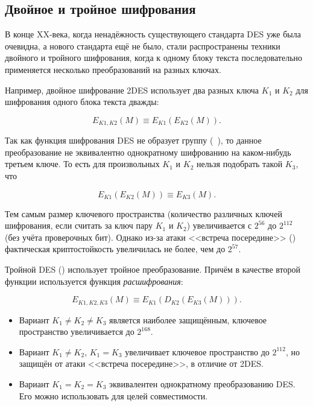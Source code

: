 \subsection{Двойное и тройное шифрования}

В конце XX-века, когда ненадёжность существующего стандарта DES уже была очевидна, а нового стандарта ещё не было, стали распространены техники двойного и тройного шифрования, когда к одному блоку текста последовательно применяется несколько преобразований на разных ключах.

Например, двойное шифрование 2DES использует два разных ключа $K_1$ и $K_2$ для шифрования одного блока текста дважды:

\[ E_{K1, K2} \left( M \right) \equiv E_{K1} \left( E_{K2} \left( M \right) \right). \]

Так как функция шифрования DES не образует группу (~\cite{Kaliski:Rivest:Sherman:1988, Campbell:Wiener:1993}), то данное преобразование не эквивалентно однократному шифрованию на каком-нибудь третьем ключе. То есть для произвольных $K_1$ и $K_2$ нельзя подобрать такой $K_3$, что

\[E_{K1} \left( E_{K2} \left( M \right) \right) \equiv E_{K3} \left( M \right).\]

Тем самым размер ключевого пространства (количество различных ключей шифрования, если считать за ключ пару $K_1$ и $K_2$) увеличивается с $2^{56}$ до $2^{112}$ (без учёта проверочных бит). Однако из-за атаки <<встреча посередине>> () фактическая криптостойкость увеличилась не более, чем до $2^{57}$.

Тройной DES () использует тройное преобразование. Причём в качестве второй функции используется функция \emph{расшифрования}:

\[ E_{K1, K2, K3} \left( M \right) \equiv E_{K1} \left( D_{K2} \left( E_{K3} \left( M \right) \right) \right). \]

\begin{itemize}
	\item Вариант $K_1 \neq K_2 \neq K_3$ является наиболее защищённым, ключевое пространство увеличивается до $2^{168}$.
	\item Вариант $K_1 \neq K_2$, $K_1 = K_3$ увеличивает ключевое пространство до $2^{112}$, но защищён от атаки <<встреча посередине>>, в отличие от 2DES.
	\item Вариант $K_1 = K_2 = K_3$ эквивалентен однократному преобразованию DES. Его можно использовать для целей совместимости.
\end{itemize}

